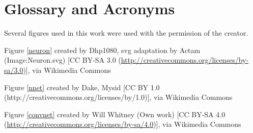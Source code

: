 \chapter{Glossary and Acronyms}
\label{app_credits}

Several figures used in this work were used with the permission of the creator.

Figure \ref{neuron} created by Dhp1080, svg adaptation by Actam (Image:Neuron.svg) [CC BY-SA 3.0 (\url{http://creativecommons.org/licenses/by-sa/3.0})], via Wikimedia Commons

Figure \ref{nnet} created by Dake, Mysid [CC BY 1.0 (http://creativecommons.org/licenses/by/1.0)], via Wikimedia Commons

Figure \ref{convnet} created by Will Whitney (Own work) [CC BY-SA 4.0 (\url{http://creativecommons.org/licenses/by-sa/4.0})], via Wikimedia Commons

